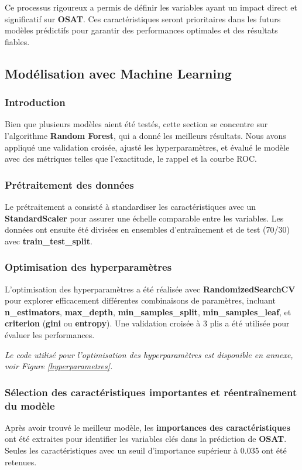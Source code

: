 Ce processus rigoureux a permis de définir les variables ayant un impact direct et significatif sur \textbf{OSAT}. Ces caractéristiques seront prioritaires dans les futurs modèles prédictifs pour garantir des performances optimales et des résultats fiables.

\subsection{Modélisation avec Machine Learning}

\subsubsection{Introduction}
Bien que plusieurs modèles aient été testés, cette section se concentre sur l'algorithme \textbf{Random Forest}, qui a donné les meilleurs résultats. Nous avons appliqué une validation croisée, ajusté les hyperparamètres, et évalué le modèle avec des métriques telles que l'exactitude, le rappel et la courbe ROC.

\subsubsection{Prétraitement des données}
Le prétraitement a consisté à standardiser les caractéristiques avec un \textbf{StandardScaler} pour assurer une échelle comparable entre les variables. Les données ont ensuite été divisées en ensembles d'entraînement et de test (70/30) avec \textbf{train\_test\_split}.

\subsubsection{Optimisation des hyperparamètres}
L'optimisation des hyperparamètres a été réalisée avec \textbf{RandomizedSearchCV} pour explorer efficacement différentes combinaisons de paramètres, incluant \textbf{n\_estimators}, \textbf{max\_depth}, \textbf{min\_samples\_split}, \textbf{min\_samples\_leaf}, et \textbf{criterion} (\textbf{gini} ou \textbf{entropy}). Une validation croisée à 3 plis a été utilisée pour évaluer les performances.

\textit{Le code utilisé pour l'optimisation des hyperparamètres est disponible en annexe, voir Figure \ref{hyperparametres}.}

\subsubsection{Sélection des caractéristiques importantes et réentraînement du modèle}
Après avoir trouvé le meilleur modèle, les \textbf{importances des caractéristiques} ont été extraites pour identifier les variables clés dans la prédiction de \textbf{OSAT}. Seules les caractéristiques avec un seuil d'importance supérieur à 0.035 ont été retenues.

